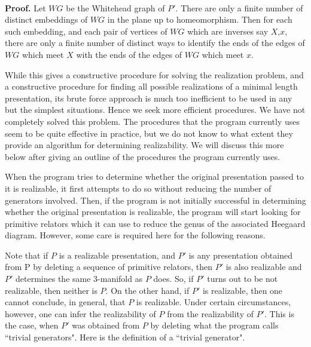 \documentclass[12pt]{amsart}
\newcommand{\pf}{\ \\ \noindent \textbf{Proof.} }
\begin{document}
\pf   Let $WG$ be the Whitehead graph of $P'$. There are only a finite number of distinct
        embeddings of $WG$ in the plane up to homeomorphism. Then for each such embedding, and
        each pair of vertices of $WG$ which are inverses say $X$,$x$, there are only a finite number
        of distinct ways to identify the ends of the edges of $WG$ which meet $X$ with the ends of
        the edges of $WG$ which meet $x$.
        
                While this gives a constructive procedure for solving the realization problem, and
        a constructive procedure for finding all possible realizations of a minimal length
        presentation, its brute force approach is much too inefficient to be used in any but
        the simplest situations. Hence we seek more efficient procedures.
                We have not completely solved this problem. The procedures that the program
        currently uses seem to be quite effective in practice, but we do not know to what extent
        they provide an algorithm for determining realizability. We will discuss this more below
        after giving an outline of the procedures the program currently uses.   

                When the program tries to determine whether the original presentation passed to it is
        realizable, it first attempts to do so without reducing the number of generators involved.
        Then, if the program is not initially successful in determining whether the original
        presentation is realizable, the program will start looking for primitive relators which
        it can use to reduce the genus of the associated Heegaard diagram. However, some care is
        required here for the following reasons.

                Note that if $P$ is a realizable presentation, and $P'$ is any presentation obtained from P
        by deleting a sequence of primitive relators, then $P'$ is also realizable and $P'$ determines
        the same 3-manifold as $P$ does. So, if $P'$ turns out to be not realizable, then neither is $P$.
        On the other hand, if $P'$ is realizable, then one cannot conclude, in general, that $P$ is
        realizable. Under certain circumstances, however, one can infer the realizability of $P$ from
        the realizability of $P'$. This is the case, when $P'$ was obtained from $P$ by deleting what the
        program calls  ``trivial generators". Here is the definition of a  ``trivial generator".
                
\end{document}
